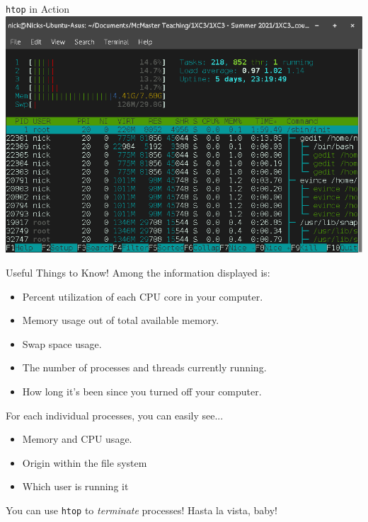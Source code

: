 \documentclass[11pt]{beamer}
\begin{document}
\begin{frame}{\texttt{htop} in Action}
\center
\includegraphics[scale=0.3]{htop2.png}
\end{frame}

\begin{frame}{Useful Things to Know!}
Among the information displayed is:
\begin{itemize}
\item Percent utilization of each CPU core in your computer.
\item Memory usage out of total available memory.
\item Swap space usage.
\item The number of processes and threads currently running.
\item How long it's been since you turned off your computer.  
\end{itemize}
For each individual processes, you can easily see...
\begin{itemize}
\item Memory and CPU usage. 
\item Origin within the file system
\item Which user is running it
\end{itemize}
You can use \texttt{htop} to \emph{terminate} processes!  Hasta la vista, baby!  
\end{frame}
\end{document}
